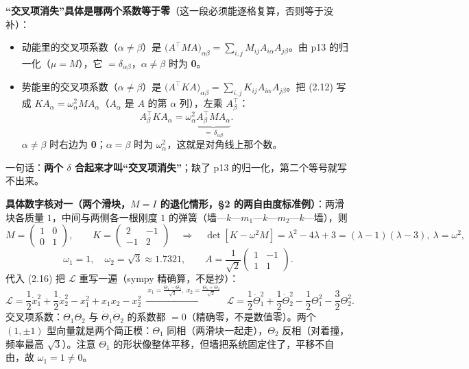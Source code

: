 \documentclass[11pt]{ctexart}
\begin{document}
\textbf{“交叉项消失”具体是哪两个系数等于零}（这一段必须能逐格复算，否则等于没补）：

\begin{itemize}
\item 动能里的交叉项系数（$\alpha\ne\beta$）是 $\bigl(A^{\!\top}MA\bigr)_{\alpha\beta}=\sum_{i,j}M_{ij}A_{i\alpha}A_{j\beta}$。由 p13 的归一化（$\mu=M$），它 $=\delta_{\alpha\beta}$，$\alpha\ne\beta$ 时为 \textbf{0}。
\item 势能里的交叉项系数（$\alpha\ne\beta$）是 $\bigl(A^{\!\top}KA\bigr)_{\alpha\beta}=\sum_{i,j}K_{ij}A_{i\alpha}A_{j\beta}$。把 (2.12) 写成 $KA_\alpha=\omega_\alpha^2MA_\alpha$（$A_\alpha$ 是 $A$ 的第 $\alpha$ 列），左乘 $A_\beta^{\!\top}$：
\[
A_\beta^{\!\top}KA_\alpha=\omega_\alpha^2\underbrace{A_\beta^{\!\top}MA_\alpha}_{=\,\delta_{\alpha\beta}} .
\]
$\alpha\ne\beta$ 时右边为 \textbf{0}；$\alpha=\beta$ 时为 $\omega_\alpha^2$，这就是对角线上那个数。
\end{itemize}
一句话：\textbf{两个 $\delta$ 合起来才叫“交叉项消失”}；缺了 p13 的归一化，第二个等号就写不出来。

\textbf{具体数字核对一（两个滑块，$M=I$ 的退化情形，§2 的两自由度标准例）}：两滑块各质量 $1$，中间与两侧各一根刚度 $1$ 的弹簧（墙—$k$—$m_1$—$k$—$m_2$—$k$—墙），则
\[
M=\begin{pmatrix}1&0\\0&1\end{pmatrix},\qquad
K=\begin{pmatrix}2&-1\\-1&2\end{pmatrix}
\quad\Longrightarrow\quad
\det[K-\omega^2M]=\lambda^2-4\lambda+3=(\lambda-1)(\lambda-3),\ \lambda=\omega^2,
\]
\[
\omega_1=1,\quad\omega_2=\sqrt3\approx1.7321,\qquad
A=\frac{1}{\sqrt2}\begin{pmatrix}1&-1\\1&1\end{pmatrix}.
\]
代入 (2.16) 把 $\mathcal{L}$ 重写一遍（sympy 精确算，不是抄）：
\[
\mathcal{L}=\frac12\dot x_1^2+\frac12\dot x_2^2-x_1^2+x_1x_2-x_2^2
\ \xrightarrow{\ x_1=\frac{\Theta_1-\Theta_2}{\sqrt2},\ x_2=\frac{\Theta_1+\Theta_2}{\sqrt2}\ }\
\mathcal{L}=\frac12\dot\Theta_1^2+\frac12\dot\Theta_2^2-\frac12\Theta_1^2-\frac32\Theta_2^2 .
\]
交叉项系数：$\Theta_1\Theta_2$ 与 $\dot\Theta_1\dot\Theta_2$ 的系数都 $=0$（精确零，不是数值零）。两个 $(1,\pm1)$ 型向量就是两个简正模：$\Theta_1$ 同相（两滑块一起走），$\Theta_2$ 反相（对着撞，频率最高 $\sqrt3$）。注意 $\Theta_1$ 的形状像整体平移，但墙把系统固定住了，平移不自由，故 $\omega_1=1\ne0$。
\end{document}

